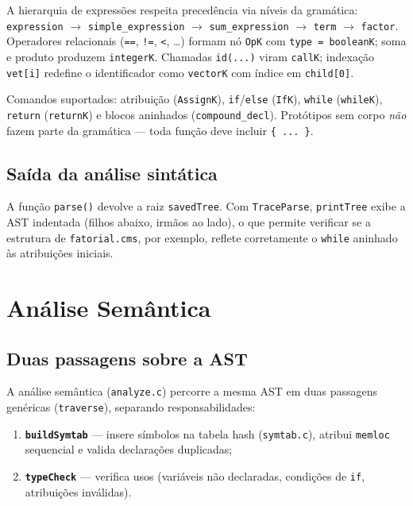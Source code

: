 \documentclass[
	12pt,				%
	openright,			%
	a4paper,			%
	english,			%
	french,				%
	spanish,			%
	brazil,				%
	]{abntex2}
\begin{document}
A hierarquia de expressões respeita precedência via níveis da gramática:
\texttt{expression} $\rightarrow$ \texttt{simple\_expression} $\rightarrow$ \texttt{sum\_expression} $\rightarrow$ \texttt{term} $\rightarrow$ \texttt{factor}.
Operadores relacionais (\texttt{==}, \texttt{!=}, \texttt{<}, \ldots) formam nó \texttt{OpK} com \texttt{type = booleanK}; soma e produto produzem \texttt{integerK}.
Chamadas \texttt{id(...)} viram \texttt{callK}; indexação \texttt{vet[i]} redefine o identificador como \texttt{vectorK} com índice em \texttt{child[0]}.

Comandos suportados: atribuição (\texttt{AssignK}), \texttt{if}/\texttt{else} (\texttt{IfK}), \texttt{while} (\texttt{whileK}), \texttt{return} (\texttt{returnK}) e blocos aninhados (\texttt{compound\_decl}). Protótipos sem corpo \emph{não} fazem parte da gramática --- toda função deve incluir \texttt{\{ ... \}}.

\subsection{Saída da análise sintática}

A função \texttt{parse()} devolve a raiz \texttt{savedTree}. Com \texttt{TraceParse}, \texttt{printTree} exibe a AST indentada (filhos abaixo, irmãos ao lado), o que permite verificar se a estrutura de \texttt{fatorial.cms}, por exemplo, reflete corretamente o \texttt{while} aninhado às atribuições iniciais.

\section{Análise Semântica}

\subsection{Duas passagens sobre a AST}

A análise semântica (\texttt{analyze.c}) percorre a mesma AST em duas passagens genéricas (\texttt{traverse}), separando responsabilidades:

\begin{enumerate}
    \item \textbf{\texttt{buildSymtab}} --- insere símbolos na tabela hash (\texttt{symtab.c}), atribui \texttt{memloc} sequencial e valida declarações duplicadas;
    \item \textbf{\texttt{typeCheck}} --- verifica usos (variáveis não declaradas, condições de \texttt{if}, atribuições inválidas).
\end{enumerate}
\end{document}
